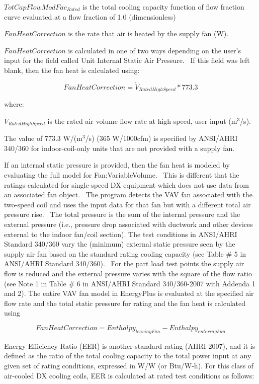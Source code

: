\(TotCapFlowModFa{c_{Rated}}\) is the total cooling capacity function of flow fraction curve evaluated at a flow fraction of 1.0 (dimensionless)

\(FanHeatCorrection\) is the rate that air is heated by the supply fan (W).

\(FanHeatCorrection\) is calculated in one of two ways depending on the user's input for the field called Unit Internal Static Air Pressure.~ If this field was left blank, then the fan heat is calculated using:

\begin{equation}
FanHeatCorrection = {\dot V_{RatedHighSpeed}}*773.3
\end{equation}

where:

\({\dot V_{RatedHighSpeed}}\) is the rated air volume flow rate at high speed, user input (m\(^{3}\)/s).

The value of 773.3 W/(m\(^{3}\)/s) (365 W/1000cfm) is specified by ANSI/AHRI 340/360 for indoor-coil-only units that are not provided with a supply fan.

If an internal static pressure is provided, then the fan heat is modeled by evaluating the full model for Fan:VariableVolume.~ This is different that the ratings calculated for single-speed DX equipment which does not use data from an associated fan object.~ The program detects the VAV fan associated with the two-speed coil and uses the input data for that fan but with a different total air pressure rise.~ The total pressure is the sum of the internal pressure and the external pressure (i.e., pressure drop associated with ductwork and other devices external to the indoor fan/coil section). The test conditions in ANSI/AHRI Standard 340/360 vary the (minimum) external static pressure seen by the supply air fan based on the standard rating cooling capacity (see Table \# 5 in ANSI/AHRI Standard 340/360).~ For the part load test points the supply air flow is reduced and the external pressure varies with the square of the flow ratio (see Note 1 in Table \# 6 in ANSI/AHRI Standard 340/360-2007 with Addenda 1 and 2). The entire VAV fan model in EnergyPlus is evaluated at the specified air flow rate and the total static pressure for rating and the fan heat is calculated using

\begin{equation}
FanHeatCorrection = Enthalp{y_{leavingFan}} - Enthalp{y_{enteringFan}}
\end{equation}

Energy Efficiency Ratio (EER) is another standard rating (AHRI 2007), and it is defined as the ratio of the total cooling capacity to the total power input at any given set of rating conditions, expressed in W/W (or Btu/W-h). For this class of air-cooled DX cooling coils, EER is calculated at rated test conditions as follows:

